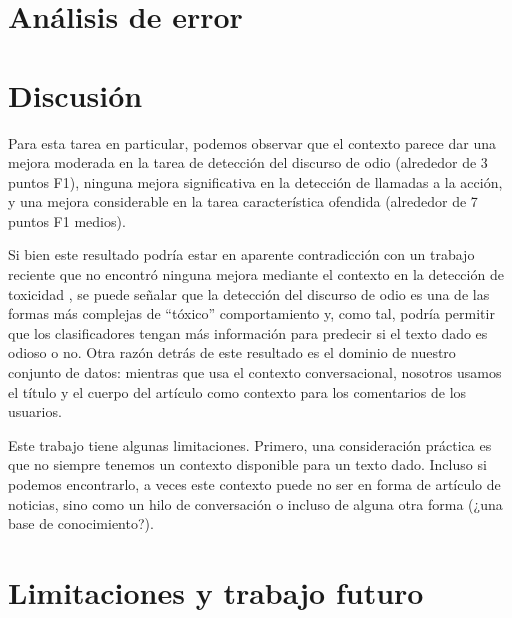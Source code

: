 \section{Análisis de error}

\section{Discusión}

Para esta tarea en particular, podemos observar que el contexto parece dar una mejora moderada en la tarea de detección del discurso de odio (alrededor de 3 puntos F1), ninguna mejora significativa en la detección de llamadas a la acción, y una mejora considerable en la tarea característica ofendida (alrededor de 7 puntos F1 medios).

Si bien este resultado podría estar en aparente contradicción con un trabajo reciente que no encontró ninguna mejora mediante el contexto en la detección de toxicidad \cite{pavlopoulos2020toxicity}, se puede señalar que la detección del discurso de odio es una de las formas más complejas de ``tóxico'' comportamiento y, como tal, podría permitir que los clasificadores tengan más información para predecir si el texto dado es odioso o no. Otra razón detrás de este resultado es el dominio de nuestro conjunto de datos: mientras que \citet{pavlopoulos2020toxicity} usa el contexto conversacional, nosotros usamos el título y el cuerpo del artículo como contexto para los comentarios de los usuarios.

Este trabajo tiene algunas limitaciones. Primero, una consideración práctica es que no siempre tenemos un contexto disponible para un texto dado. Incluso si podemos encontrarlo, a veces este contexto puede no ser en forma de artículo de noticias, sino como un hilo de conversación o incluso de alguna otra forma (¿una base de conocimiento?).

\section{Limitaciones y trabajo futuro}